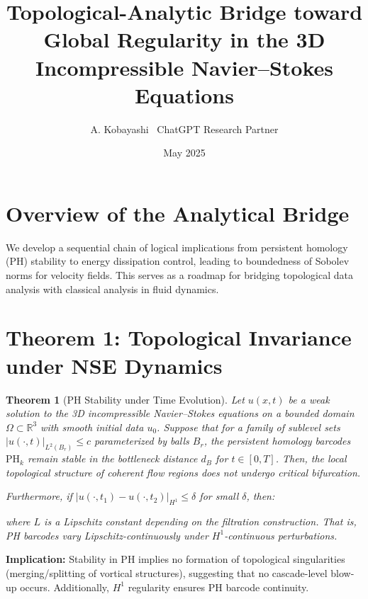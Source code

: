 \documentclass[11pt]{article}
\title{Topological-Analytic Bridge toward Global Regularity in the 3D Incompressible Navier--Stokes Equations}
\author{A. Kobayashi \ ChatGPT Research Partner}
\date{May 2025}
\newtheorem{theorem}{Theorem}[section]
\begin{document}
\maketitle

\section*{Overview of the Analytical Bridge}
We develop a sequential chain of logical implications from persistent homology (PH) stability to energy dissipation control, leading to boundedness of Sobolev norms for velocity fields. This serves as a roadmap for bridging topological data analysis with classical analysis in fluid dynamics.

\section{Theorem 1: Topological Invariance under NSE Dynamics}
\begin{theorem}[PH Stability under Time Evolution]
Let $u(x,t)$ be a weak solution to the 3D incompressible Navier--Stokes equations on a bounded domain $\Omega \subset \mathbb{R}^3$ with smooth initial data $u_0$. Suppose that for a family of sublevel sets ${ |u(\cdot,t)|_{L^2(B_r)} \leq c }$ parameterized by balls $B_r$, the persistent homology barcodes $\mathrm{PH}_k$ remain stable in the bottleneck distance $d_B$ for $t \in [0,T]$. Then, the local topological structure of coherent flow regions does not undergo critical bifurcation.

Furthermore, if $|u(\cdot,t_1) - u(\cdot,t_2)|_{H^1} \leq \delta$ for small $\delta$, then:



where $L$ is a Lipschitz constant depending on the filtration construction. That is, PH barcodes vary Lipschitz-continuously under $H^1$-continuous perturbations.
\end{theorem}

\textbf{Implication:} Stability in PH implies no formation of topological singularities (merging/splitting of vortical structures), suggesting that no cascade-level blow-up occurs. Additionally, $H^1$ regularity ensures PH barcode continuity.
\end{document}
